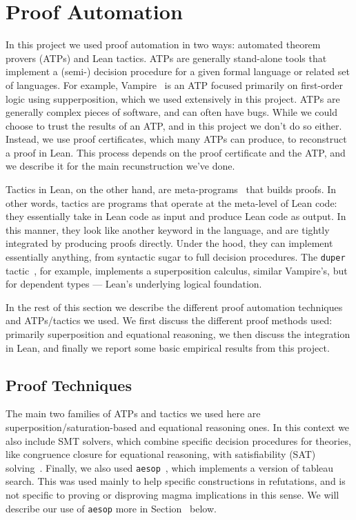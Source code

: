 \section{Proof Automation}\label{automated-sec}

In this project we used proof automation in two ways: automated theorem provers (ATPs) and Lean tactics.
ATPs are generally stand-alone tools that implement a (semi-) decision procedure for a given formal language or related set of languages.
For example, Vampire~\cite{DBLP:conf/cav/KovacsV13} is an ATP focused primarily on first-order logic using supperposition, which we used extensively in this project.
ATPs are generally complex pieces of software, and can often have bugs.
While we could choose to trust the results of an ATP, and in this project we don't do so either.
Instead, we use proof certificates, which many ATPs can produce, to reconstruct a proof in Lean.
This process depends on the proof certificate and the ATP, and we describe it for the main recunstruction we've done.

Tactics in Lean, on the other hand, are meta-programs~\cite{DBLP:journals/pacmpl/EbnerURAM17} that builds proofs.
In other words, tactics are programs that operate at the meta-level of Lean code: they essentially take in Lean code as input and produce Lean code as output.
In this manner, they look like another keyword in the language, and are tightly integrated by producing proofs directly.
Under the hood, they can implement essentially anything, from syntactic sugar to full decision procedures.
The \texttt{duper} tactic~\cite{DBLP:conf/itp/CluneQBA24}, for example, implements a superposition calculus, similar Vampire's, but for dependent types --- Lean's underlying logical foundation.

In the rest of this section we describe the different proof automation techniques and ATPs/tactics we used.
We first discuss the different proof methods used: primarily superposition and equational reasoning, we then discuss the integration in Lean, and finally we report some basic empirical results from this project.

\subsection{Proof Techniques}

The main two families of ATPs and tactics we used here are superposition/saturation-based and equational reasoning ones.
In this context we also include SMT solvers, which combine specific decision procedures for theories, like congruence closure for equational reasoning, with satisfiability (SAT) solving~\cite{}.
Finally, we also used \texttt{aesop}~\cite{DBLP:conf/cpp/LimpergF23}, which implements a version of tableau search.
This was used mainly to help specific constructions in refutations, and is not specific to proving or disproving magma implications in this sense.
We will describe our use of \texttt{aesop} more in Section~ below.

